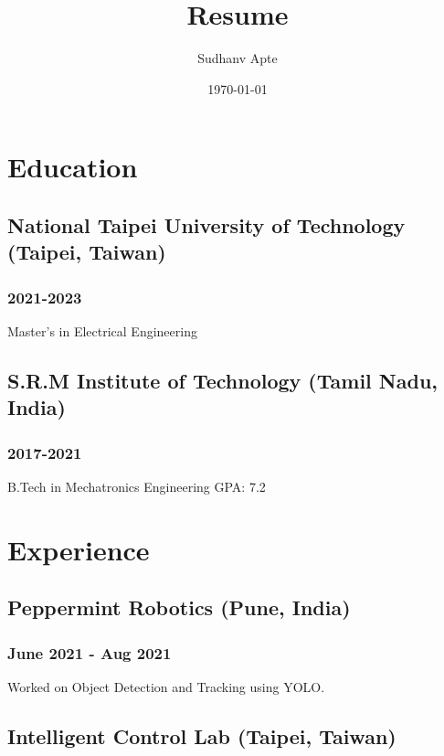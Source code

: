 \documentclass[11pt]{article}
\author{Sudhanv Apte}
\date{\today}
\title{Resume}
\begin{document}
\maketitle
\tableofcontents



\section{Education}
\label{sec:orge54313e}

\subsection{National Taipei University of Technology (Taipei, Taiwan)}
\label{sec:org5a47aee}
\subsubsection{2021-2023}
\label{sec:org9de1d7b}
Master's in Electrical Engineering


\subsection{S.R.M Institute of Technology (Tamil Nadu, India)}
\label{sec:org7cfbcc8}
\subsubsection{2017-2021}
\label{sec:org5d94eaa}
B.Tech in Mechatronics Engineering
GPA: 7.2

\section{Experience}
\label{sec:orgff476ae}

\subsection{Peppermint Robotics (Pune, India)}
\label{sec:org3dd4cac}
\subsubsection{June 2021 - Aug 2021}
\label{sec:org8af21f5}
Worked on Object Detection and Tracking using YOLO.

\subsection{Intelligent Control Lab (Taipei, Taiwan)}
\label{sec:orgdbe8af5}
\end{document}
